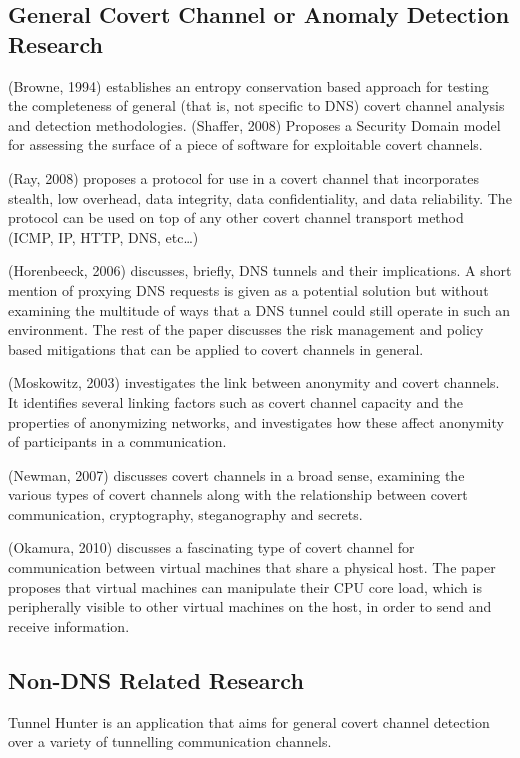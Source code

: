 \documentclass[12pt]{article}
\theoremstyle{remark}
\theoremstyle{definition}
\theoremstyle{definition}
\theoremstyle{definition}
\begin{document}
\subsection{General Covert Channel or Anomaly Detection Research}
(Browne, 1994)\cite{Browne1994} establishes an entropy conservation based
approach for testing the completeness of general (that is, not specific to DNS)
covert channel analysis and detection methodologies. (Shaffer,
2008)\cite{Shaffer2008} Proposes a Security Domain model for assessing the
surface of a piece of software for exploitable covert channels.

(Ray, 2008)\cite{Ray2008} proposes a protocol for use in a covert channel that
incorporates stealth, low overhead, data integrity, data confidentiality, and
data reliability. The protocol can be used on top of any other covert channel
transport method (ICMP, IP, HTTP, DNS, etc\ldots)

(Horenbeeck, 2006)\cite{Horenbeeck2006} discusses, briefly, DNS tunnels and
their implications. A short mention of proxying DNS requests is given as a
potential solution but without examining the multitude of ways that a DNS tunnel
could still operate in such an environment. The rest of the paper discusses the
risk management and policy based mitigations that can be applied to covert
channels in general.

(Moskowitz, 2003)\cite{Moskowitz2003} investigates the link between anonymity
and covert channels. It identifies several linking factors such as covert
channel capacity and the properties of anonymizing networks, and investigates
how these affect anonymity of participants in a communication.

(Newman, 2007)\cite{Newman2007} discusses covert channels in a broad sense,
examining the various types of covert channels along with the relationship
between covert communication, cryptography, steganography and secrets.

(Okamura, 2010)\cite{Okamura2010} discusses a fascinating type of covert channel
for communication between virtual machines that share a physical host. The paper
proposes that virtual machines can manipulate their CPU core load, which is
peripherally visible to other virtual machines on the host, in order to send and
receive information.

\subsection{Non-DNS Related Research}
Tunnel Hunter\cite{Dusi2009} is an application that aims for general covert
channel detection over a variety of tunnelling communication channels.
\end{document}
